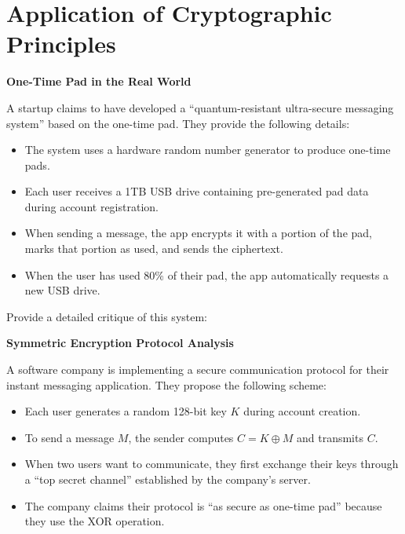 \documentclass[10pt,a4paper,american]{exam}
\begin{document}
\section*{Application of Cryptographic Principles}
\begin{questions}
	\question[15] \textbf{One-Time Pad in the Real World}

	A startup claims to have developed a ``quantum-resistant ultra-secure messaging system'' based on the one-time pad. They provide the following details:

	\begin{itemize}
		\item The system uses a hardware random number generator to produce one-time pads.
		\item Each user receives a 1TB USB drive containing pre-generated pad data during account registration.
		\item When sending a message, the app encrypts it with a portion of the pad, marks that portion as used, and sends the ciphertext.
		\item When the user has used 80\% of their pad, the app automatically requests a new USB drive.
	\end{itemize}

	Provide a detailed critique of this system:

	\question[15] \textbf{Symmetric Encryption Protocol Analysis}

	A software company is implementing a secure communication protocol for their instant messaging application. They propose the following scheme:

	\begin{itemize}
		\item Each user generates a random 128-bit key $K$ during account creation.
		\item To send a message $M$, the sender computes $C = K \oplus M$ and transmits $C$.
		\item When two users want to communicate, they first exchange their keys through a ``top secret channel'' established by the company's server.
		\item The company claims their protocol is ``as secure as one-time pad'' because they use the XOR operation.
	\end{itemize}


\end{questions}
\end{document}
